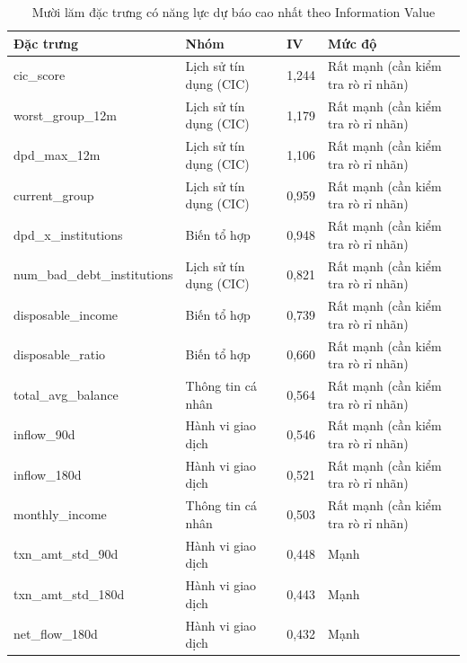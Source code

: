 \begin{table}[!htbp]
\centering
\caption{Mười lăm đặc trưng có năng lực dự báo cao nhất theo Information Value}
\label{tab:iv-top}
\small
\setlength{\tabcolsep}{5.0pt}
\begin{tabular}{@{}L{5.0cm}L{2.4cm}R{1.8cm}L{5.0cm}@{}}
\toprule
\textbf{Đặc trưng} & \textbf{Nhóm} & \textbf{IV} & \textbf{Mức độ} \\
\midrule
cic\_score & Lịch sử tín dụng (CIC) & 1,244 & Rất mạnh (cần kiểm tra rò rỉ nhãn) \\
worst\_\allowbreak group\_\allowbreak 12m & Lịch sử tín dụng (CIC) & 1,179 & Rất mạnh (cần kiểm tra rò rỉ nhãn) \\
dpd\_\allowbreak max\_\allowbreak 12m & Lịch sử tín dụng (CIC) & 1,106 & Rất mạnh (cần kiểm tra rò rỉ nhãn) \\
current\_\allowbreak group & Lịch sử tín dụng (CIC) & 0,959 & Rất mạnh (cần kiểm tra rò rỉ nhãn) \\
dpd\_\allowbreak x\_\allowbreak institutions & Biến tổ hợp & 0,948 & Rất mạnh (cần kiểm tra rò rỉ nhãn) \\
num\_\allowbreak bad\_\allowbreak debt\_\allowbreak institutions & Lịch sử tín dụng (CIC) & 0,821 & Rất mạnh (cần kiểm tra rò rỉ nhãn) \\
disposable\_\allowbreak income & Biến tổ hợp & 0,739 & Rất mạnh (cần kiểm tra rò rỉ nhãn) \\
disposable\_\allowbreak ratio & Biến tổ hợp & 0,660 & Rất mạnh (cần kiểm tra rò rỉ nhãn) \\
total\_\allowbreak avg\_\allowbreak balance & Thông tin cá nhân & 0,564 & Rất mạnh (cần kiểm tra rò rỉ nhãn) \\
inflow\_90d & Hành vi giao dịch & 0,546 & Rất mạnh (cần kiểm tra rò rỉ nhãn) \\
inflow\_\allowbreak 180d & Hành vi giao dịch & 0,521 & Rất mạnh (cần kiểm tra rò rỉ nhãn) \\
monthly\_\allowbreak income & Thông tin cá nhân & 0,503 & Rất mạnh (cần kiểm tra rò rỉ nhãn) \\
txn\_\allowbreak amt\_\allowbreak std\_\allowbreak 90d & Hành vi giao dịch & 0,448 & Mạnh \\
txn\_\allowbreak amt\_\allowbreak std\_\allowbreak 180d & Hành vi giao dịch & 0,443 & Mạnh \\
net\_\allowbreak flow\_\allowbreak 180d & Hành vi giao dịch & 0,432 & Mạnh \\
\bottomrule
\end{tabular}
\end{table}
